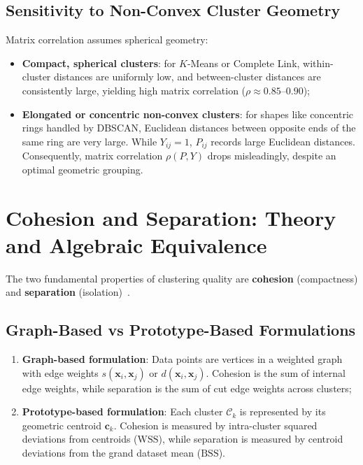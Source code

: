 \subsection{Sensitivity to Non-Convex Cluster Geometry}
Matrix correlation assumes spherical geometry:
\begin{itemize}
    \item \textbf{Compact, spherical clusters}: for $K$-Means or Complete Link, within-cluster distances are uniformly low, and between-cluster distances are consistently large, yielding high matrix correlation ($\rho \approx 0.85$–$0.90$);
    \item \textbf{Elongated or concentric non-convex clusters}: for shapes like concentric rings handled by DBSCAN, Euclidean distances between opposite ends of the same ring are very large. While $Y_{ij} = 1$, $P_{ij}$ records large Euclidean distances. Consequently, matrix correlation $\rho(P, Y)$ drops misleadingly, despite an optimal geometric grouping.
\end{itemize}

\section{Cohesion and Separation: Theory and Algebraic Equivalence}
\label{sec:dm-cohesion-separation-theory}

The two fundamental properties of clustering quality are \textbf{cohesion} (compactness) and \textbf{separation} (isolation)~\cite{tan2018}.

\subsection{Graph-Based vs Prototype-Based Formulations}
\begin{enumerate}
    \item \textbf{Graph-based formulation}: Data points are vertices in a weighted graph with edge weights $s(\mathbf{x}_i, \mathbf{x}_j)$ or $d(\mathbf{x}_i, \mathbf{x}_j)$. Cohesion is the sum of internal edge weights, while separation is the sum of cut edge weights across clusters;
    \item \textbf{Prototype-based formulation}: Each cluster $\mathcal{C}_k$ is represented by its geometric centroid $\mathbf{c}_k$. Cohesion is measured by intra-cluster squared deviations from centroids ($\mathrm{WSS}$), while separation is measured by centroid deviations from the grand dataset mean ($\mathrm{BSS}$).
\end{enumerate}

